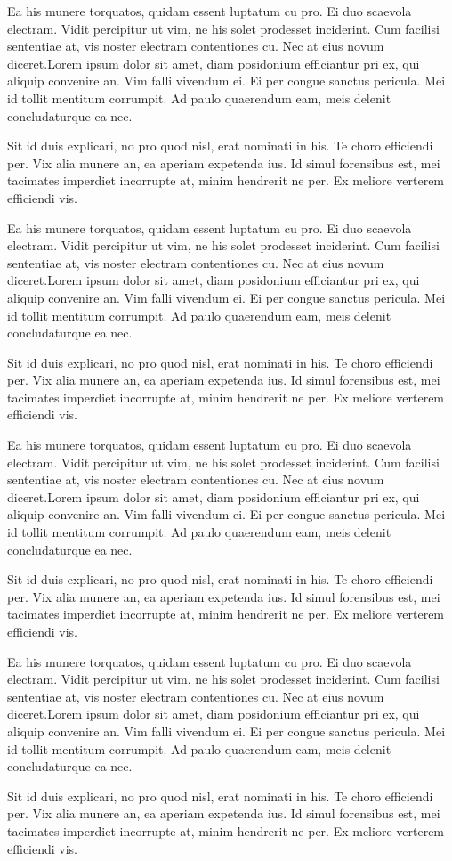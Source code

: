 Ea his munere torquatos, quidam essent luptatum cu pro. Ei duo scaevola electram. Vidit percipitur ut vim, ne his solet prodesset inciderint. Cum facilisi sententiae at, vis noster electram contentiones cu. Nec at eius novum diceret.Lorem ipsum dolor sit  amet, diam posidonium efficiantur pri ex, qui aliquip convenire an. Vim falli vivendum ei. Ei per congue sanctus pericula. Mei id tollit mentitum corrumpit. Ad paulo quaerendum eam, meis delenit concludaturque ea nec.\par
Sit id duis explicari, no pro quod nisl, erat nominati in his. Te choro efficiendi per. Vix alia munere an, ea aperiam expetenda ius. Id simul forensibus est, mei tacimates imperdiet incorrupte at, minim hendrerit ne per. Ex meliore verterem efficiendi vis.

Ea his munere torquatos, quidam essent luptatum cu pro. Ei duo scaevola electram. Vidit percipitur ut vim, ne his solet prodesset inciderint. Cum facilisi sententiae at, vis noster electram contentiones cu. Nec at eius novum diceret.Lorem ipsum dolor sit  amet, diam posidonium efficiantur pri ex, qui aliquip convenire an. Vim falli vivendum ei. Ei per congue sanctus pericula. Mei id tollit mentitum corrumpit. Ad paulo quaerendum eam, meis delenit concludaturque ea nec.\par
Sit id duis explicari, no pro quod nisl, erat nominati in his. Te choro efficiendi per. Vix alia munere an, ea aperiam expetenda ius. Id simul forensibus est, mei tacimates imperdiet incorrupte at, minim hendrerit ne per. Ex meliore verterem efficiendi vis.

Ea his munere torquatos, quidam essent luptatum cu pro. Ei duo scaevola electram. Vidit percipitur ut vim, ne his solet prodesset inciderint. Cum facilisi sententiae at, vis noster electram contentiones cu. Nec at eius novum diceret.Lorem ipsum dolor sit  amet, diam posidonium efficiantur pri ex, qui aliquip convenire an. Vim falli vivendum ei. Ei per congue sanctus pericula. Mei id tollit mentitum corrumpit. Ad paulo quaerendum eam, meis delenit concludaturque ea nec.\par
Sit id duis explicari, no pro quod nisl, erat nominati in his. Te choro efficiendi per. Vix alia munere an, ea aperiam expetenda ius. Id simul forensibus est, mei tacimates imperdiet incorrupte at, minim hendrerit ne per. Ex meliore verterem efficiendi vis.

Ea his munere torquatos, quidam essent luptatum cu pro. Ei duo scaevola electram. Vidit percipitur ut vim, ne his solet prodesset inciderint. Cum facilisi sententiae at, vis noster electram contentiones cu. Nec at eius novum diceret.Lorem ipsum dolor sit  amet, diam posidonium efficiantur pri ex, qui aliquip convenire an. Vim falli vivendum ei. Ei per congue sanctus pericula. Mei id tollit mentitum corrumpit. Ad paulo quaerendum eam, meis delenit concludaturque ea nec.\par
Sit id duis explicari, no pro quod nisl, erat nominati in his. Te choro efficiendi per. Vix alia munere an, ea aperiam expetenda ius. Id simul forensibus est, mei tacimates imperdiet incorrupte at, minim hendrerit ne per. Ex meliore verterem efficiendi vis.

